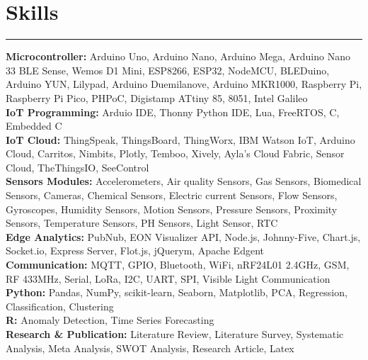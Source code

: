 \documentclass[10pt, a4paper]{article}
\begin{document}
		\section*{Skills}
		\vspace*{-2.5mm}
		\hrule 
		\vspace*{2mm}
		\textbf{Microcontroller:} Arduino Uno, Arduino Nano, Arduino Mega, Arduino Nano 33 BLE Sense, Wemos D1 Mini, ESP8266, ESP32, NodeMCU, BLEDuino, Arduino YUN, Lilypad, Arduino Duemilanove, Arduino MKR1000, Raspberry Pi, Raspberry Pi Pico, PHPoC, Digistamp ATtiny 85, 8051, Intel Galileo 
		\\
		\textbf{IoT Programming:} Arduio IDE, Thonny Python IDE, Lua, FreeRTOS, C, Embedded C
		\\	
		\textbf{IoT Cloud:} ThingSpeak, ThingsBoard, ThingWorx, IBM Watson IoT, Arduino Cloud, Carritos, Nimbits, Plotly, Temboo, Xively, Ayla's Cloud Fabric, Sensor Cloud, TheThingsIO, SeeControl
		\\
		\textbf{Sensors Modules:} Accelerometers, Air quality Sensors, Gas Sensors, Biomedical Sensors, Cameras, Chemical Sensors, Electric current Sensors, Flow Sensors, Gyroscopes, Humidity Sensors, Motion Sensors, Pressure Sensors, Proximity Sensors, Temperature Sensors, PH Sensors, Light Sensor, RTC
		\\	
		\textbf{Edge Analytics:} PubNub, EON Visualizer API, Node.js, Johnny-Five, Chart.js, Socket.io, Express Server, Flot.js, jQuerym, Apache Edgent
		\\	    
		\textbf{Communication:} MQTT, GPIO, Bluetooth, WiFi, nRF24L01 2.4GHz, GSM, RF 433MHz, Serial, LoRa, I2C, UART, SPI, Visible Light Communication 
		\\
		\textbf{Python:} Pandas, NumPy, scikit-learn, Seaborn, Matplotlib, PCA, Regression, Classification, Clustering
		\\
		\textbf{R:} Anomaly Detection, Time Series Forecasting
		\\	     
		\textbf{Research \& Publication:} Literature Review, Literature Survey, Systematic Analysis, Meta Analysis, SWOT Analysis, Research Article, Latex 

		\vspace*{-3mm}
		
	
\end{document}
